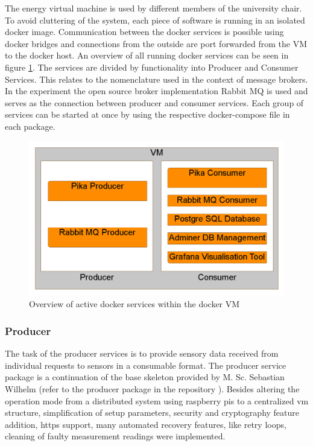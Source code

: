 The energy virtual machine is used by different members of the university chair. To avoid cluttering of the system, each piece of software is running in an isolated \gls{docker} image. Communication between the docker services is possible using docker bridges and connections from the outside are port forwarded from the VM to the docker host. An overview of all running docker services can be seen in figure \ref{fig:docker_overview}. The services are divided by functionality into Producer and Consumer Services. This relates to the nomenclature used in the context of message brokers. In the experiment the open source broker implementation Rabbit MQ is used and serves as the connection between producer and consumer services. Each group of services can be started at once by using the respective docker-compose file in each package.
\begin{figure}
	\centering
	\includegraphics[width=\textwidth]{images/Docker_Services_Overview.png}
	\caption{Overview of active docker services within the docker VM}
	\label{fig:docker_overview}
\end{figure}
\subsubsection{Producer}
The task of the producer services is to provide sensory data received from individual requests to sensors in a consumable format. The producer service package is a continuation of the base skeleton provided by M. Sc. Sebastian Wilhelm (refer to the producer package in the repository \cite{wilhelm_repo}). Besides altering the operation mode from a distributed system using raspberry pis to a centralized vm structure, simplification of setup parameters, security and cryptography feature addition, https support, many automated recovery features, like retry loops, cleaning of faulty measurement readings were implemented.
